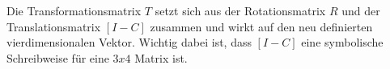 Die Transformationsmatrix $T$ setzt sich aus der Rotationsmatrix $R$ und der Translationsmatrix  $[I -C]$ zusammen und wirkt auf den neu definierten vierdimensionalen Vektor. Wichtig dabei ist, dass $[I -C]$ eine symbolische Schreibweise für eine $3x4$ Matrix ist.   




